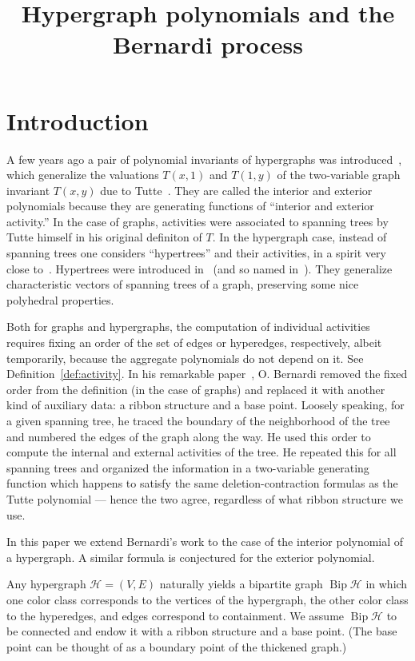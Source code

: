 \documentclass[ALCO,ThmDefs,Unicode,epreuves]{cedram}
\author{\firstname{Tam{\'a}s} \lastname{K{\'a}lm{\'a}n}}
\author{\firstname{Lilla} \lastname{T{\'o}thm{\'e}r{\'e}sz}}
\title{Hypergraph polynomials and the Bernardi process}
\newcommand{\HH}{\mathcal H}
\DeclareMathOperator{\bip}{Bip}
\begin{document}
	

\maketitle



\section{Introduction}

A few years ago a pair of polynomial invariants of hypergraphs was introduced~\cite{hiperTutte}, which generalize the valuations $T(x,1)$ and $T(1,y)$ of the two-variable graph invariant $T(x,y)$ due to Tutte~\cite{Tutte}. They are called the interior and exterior polynomials because they are generating functions of ``interior and exterior activity.'' In the case of graphs, activities were associated to spanning trees by Tutte himself in his original definiton of $T$. In the hypergraph case, instead of spanning trees one considers ``hypertrees'' and their activities, in a spirit very close to~\cite{Tutte}. Hypertrees were introduced in~\cite{alex} (and so named in~\cite{hiperTutte}). They generalize characteristic vectors of spanning trees of a graph, preserving some nice polyhedral properties.

Both for graphs and hypergraphs, the computation of individual activities requires fixing an order of the set of edges or hyperedges, respectively, albeit temporarily, because the aggregate polynomials do not depend on it. See Definition~\ref{def:activity}. In his remarkable paper~\cite{Bernardi_Tutte}, O. Bernardi removed the fixed order from the definition (in the case of graphs) and replaced it with another kind of auxiliary data: a ribbon structure and a base point. Loosely speaking, for a given spanning tree, he traced the boundary of the neighborhood of the tree and numbered the edges of the graph along the way. He used this order to compute the internal and external activities of the tree. He repeated this for all spanning trees and organized the information in a two-variable generating function which happens to satisfy the same deletion-contraction formulas as the Tutte polynomial --- hence the two agree, regardless of what ribbon structure we use. 

In this paper we extend Bernardi's work to the case of the interior polynomial of a hypergraph. A similar formula is conjectured for the exterior polynomial.

Any hypergraph $\HH = (V,E)$ naturally yields a bipartite graph $\bip\HH$ in which one color class corresponds to the vertices of the hypergraph, the other color class to the hyperedges, and edges correspond to containment. We assume $\bip \HH$ to be connected and endow it with a ribbon structure and a base point. (The base point can be thought of as a boundary point of the thickened graph.)
\end{document}

